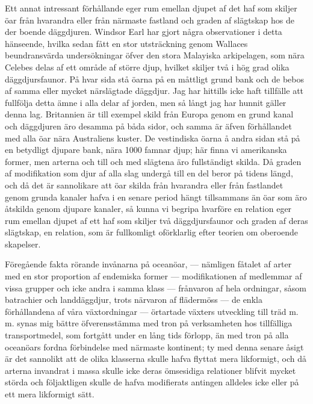 Ett annat intressant förhållande eger rum emellan djupet af det haf som skiljer öar från hvarandra eller från närmaste fastland och graden af slägtskap hos de der boende däggdjuren. Windsor Earl har gjort några observationer i detta hänseende, hvilka sedan fått en stor utsträckning genom Wallaces beundransvärda undersökningar öfver den stora Malayiska arkipelagen, som nära Celebes delas af ett område af större djup, hvilket skiljer två i hög grad olika däggdjursfaunor. På hvar sida stå öarna på en måttligt grund bank och de bebos af samma eller mycket närslägtade däggdjur. Jag har hittills icke haft tillfälle att fullfölja detta ämne i alla delar af jorden, men så långt jag har hunnit gäller denna lag. Britannien är till exempel skild från Europa genom en grund kanal och däggdjuren äro desamma på båda sidor, och samma är äfven förhållandet med alla öar nära Australiens kuster. De vestindiska öarna å andra sidan stå på en betydligt djupare bank, nära 1000 famnar djup; här finna vi amerikanska former, men arterna och till och med slägtena äro fullständigt skilda. Då graden af modifikation som djur af alla slag undergå till en del beror på tidens längd, och då det är sannolikare att öar skilda från hvarandra eller från fastlandet genom grunda kanaler hafva i en senare period hängt tillsammans än öar som äro åtskilda genom djupare kanaler, så kunna vi begripa hvarföre en relation eger rum emellan djupet af ett haf som skiljer två däggdjursfaunor och graden af deras slägtskap, en relation, som är fullkomligt oförklarlig efter teorien om oberoende skapelser.

Föregående fakta rörande invånarna på oceanöar, — nämligen fåtalet af arter med en stor proportion af endemiska former — modifikationen af medlemmar af vissa grupper och icke andra i samma klass — frånvaron af hela ordningar, såsom batrachier och landdäggdjur, trots närvaron af flädermöss — de enkla förhållandena af våra växtordningar — örtartade växters utveckling till träd m. m. synas mig bättre öfverensstämma med tron på verksamheten hos tillfälliga transportmedel, som fortgått under en lång tids förlopp, än med tron på alla oceanöars fordna förbindelse med närmaste kontinent; ty med denna senare åsigt är det sannolikt att de olika klasserna skulle hafva flyttat mera likformigt, och då arterna invandrat i massa skulle icke deras ömsesidiga relationer blifvit mycket störda och följaktligen skulle de hafva modifierats antingen alldeles icke eller på ett mera likformigt sätt.

